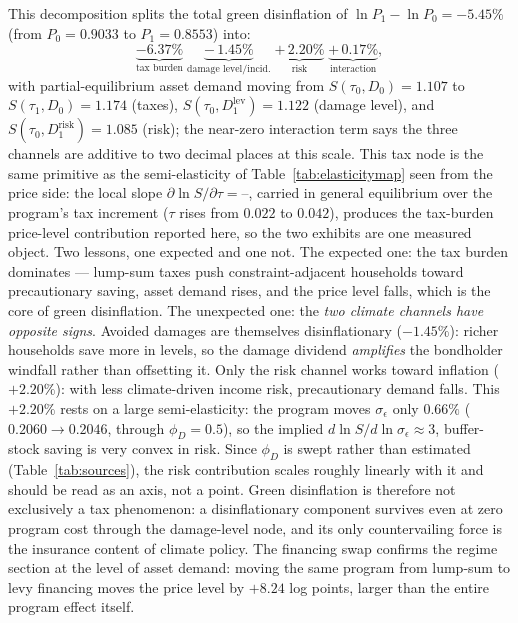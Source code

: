 \documentclass[12pt]{article}
\providecommand{\pendingnum}{\textit{--}}
\providecommand{\epsTau}{\pendingnum}\providecommand{\epsLevy}{\pendingnum}
\newcommand{\Sfun}{S}
\begin{document}
This decomposition splits the total green disinflation of
$\ln P_1 - \ln P_0 = -5.45\%$ (from $P_0 = 0.9033$ to $P_1 = 0.8553$)
into:
\[
\underbrace{-6.37\%}_{\text{tax burden}}
\;\underbrace{-\,1.45\%}_{\text{damage level/incid.}}
\;\underbrace{+\,2.20\%}_{\text{risk}}
\;\underbrace{+\,0.17\%}_{\text{interaction}},
\]
with partial-equilibrium asset demand moving from $S(\tau_0, D_0) = 1.107$
to $S(\tau_1, D_0) = 1.174$ (taxes), $S(\tau_0, D_1^{\mathrm{lev}}) =
1.122$ (damage level), and $S(\tau_0, D_1^{\mathrm{risk}}) = 1.085$
(risk); the near-zero interaction term says the three channels are
additive to two decimal places at this scale. This tax node is the same
primitive as the semi-elasticity of Table~\ref{tab:elasticitymap} seen from
the price side: the local slope $\partial\ln\Sfun/\partial\tau=\epsTau$,
carried in general equilibrium over the program's tax increment
($\tau$ rises from $0.022$ to $0.042$), produces the tax-burden price-level
contribution reported here, so the two exhibits are one measured object.
Two lessons, one expected and one not. The expected one: the tax
burden dominates --- lump-sum taxes push constraint-adjacent households
toward precautionary saving, asset demand rises, and the price level
falls, which is the core of green disinflation. The unexpected one: the
\emph{two climate channels have opposite signs}. Avoided damages are
themselves disinflationary ($-1.45\%$): richer households save more in
levels, so the damage dividend \emph{amplifies} the bondholder windfall
rather than offsetting it. Only the risk channel works toward inflation
($+2.20\%$): with less climate-driven income risk, precautionary demand
falls. This $+2.20\%$ rests on a large semi-elasticity: the program moves
$\sigma_\epsilon$ only $0.66\%$ ($0.2060\to0.2046$, through $\phi_D=0.5$),
so the implied $d\ln\Sfun/d\ln\sigma_\epsilon\approx3$, buffer-stock
saving is very convex in risk. Since $\phi_D$ is swept rather than estimated
(Table~\ref{tab:sources}), the risk contribution scales roughly linearly
with it and should be read as an axis, not a point.
Green disinflation is therefore not exclusively a tax phenomenon: a
disinflationary component survives even at zero program cost through the
damage-level node, and its only countervailing force is the insurance
content of climate policy. The
financing swap confirms the regime section at the level of asset demand:
moving the same program from lump-sum to levy financing moves the price
level by $+8.24$ log points, larger than the entire program effect
itself.
\end{document}
